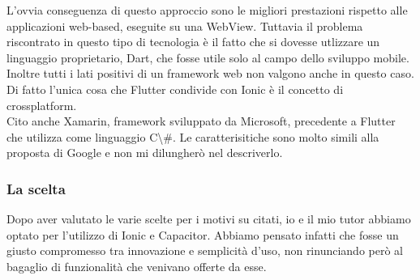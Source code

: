 L'ovvia conseguenza di questo approccio sono le migliori prestazioni rispetto alle applicazioni web-based, eseguite su una WebView.
Tuttavia il problema riscontrato in questo tipo di tecnologia è il fatto che si dovesse utlizzare un linguaggio proprietario, Dart, che
fosse utile solo al campo dello sviluppo mobile. Inoltre tutti i lati positivi di un framework web non valgono anche in questo caso. Di
fatto l'unica cosa che Flutter condivide con Ionic è il concetto di crossplatform. \\
Cito anche Xamarin, framework sviluppato da Microsoft, precedente a Flutter che utilizza come linguaggio \gls{C\#}. Le
caratterisitiche sono molto simili alla proposta di Google e non mi dilungherò nel descriverlo.

\subsubsection{La scelta}

Dopo aver valutato le varie scelte per i motivi su citati, io e il mio tutor abbiamo optato per l'utilizzo di Ionic e Capacitor. Abbiamo
pensato infatti che fosse un giusto compromesso tra innovazione e semplicità d'uso, non rinunciando però al bagaglio di funzionalità che
venivano offerte da esse.
